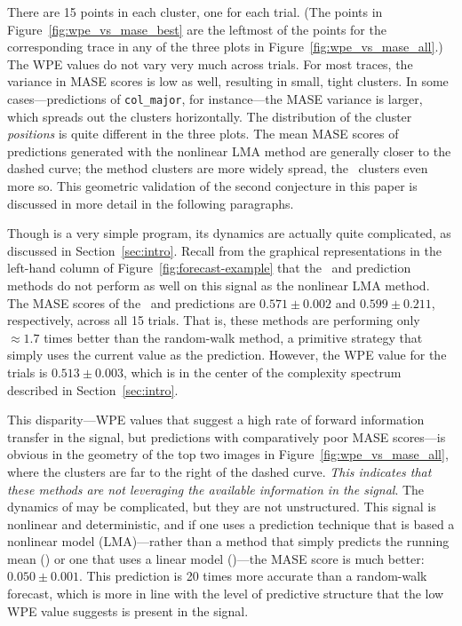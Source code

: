 There are 15 points in each cluster, one for each trial.  (The points
in Figure~\ref{fig:wpe_vs_mase_best} are the leftmost of the points
for the corresponding trace in any of the three plots in
Figure~\ref{fig:wpe_vs_mase_all}.)  The WPE values do not vary very
much across trials.  For most traces, the variance in MASE scores is
low as well, resulting in small, tight clusters.  In some
cases---\arima predictions of {\tt col\_major}, for instance---the
MASE variance is larger, which spreads out the clusters horizontally.
The distribution of the cluster \emph{positions} is quite different in
the three plots.  The mean MASE scores of predictions generated with
the nonlinear LMA method are generally closer to the dashed curve; the
\arima method clusters are more widely spread, the \naive ~clusters
even more so.  This geometric validation of the second conjecture in
this paper is discussed in more detail in the following paragraphs.

Though \col is a very simple program, its dynamics are actually quite
complicated, as discussed in Section~\ref{sec:intro}.  Recall from the
graphical representations in the left-hand column of
Figure~\ref{fig:forecast-example} that the \naive ~and \arima
prediction methods do not perform as well on this signal as the
nonlinear LMA method.  The MASE scores of the \naive ~and \arima
predictions are $0.571 \pm 0.002$ and $0.599 \pm 0.211$, respectively,
across all 15 trials.  That is, these methods are performing only
$\approx 1.7$ times better than the random-walk method, a primitive
strategy that simply uses the current value as the prediction.
However, the WPE value for the \col trials is $0.513 \pm 0.003$, which
is in the center of the complexity spectrum described in
Section~\ref{sec:intro}.

This disparity---WPE values that suggest a high rate of forward
information transfer in the signal, but predictions with comparatively
poor MASE scores---is obvious in the geometry of the top two images in
Figure~\ref{fig:wpe_vs_mase_all}, where the \col clusters are far to
the right of the dashed curve.  \emph{This indicates that these
  methods are not leveraging the available information in the signal}.
The dynamics of \col may be complicated, but they are not
unstructured.  This signal is nonlinear and
deterministic\cite{mytkowicz09}, and if one uses a prediction
technique that is based a nonlinear model (LMA)---rather than a method
that simply predicts the running mean (\naive) or one that uses a
linear model (\arima)---the MASE score is much better: $0.050 \pm
0.001$.  This prediction is 20 times more accurate than a random-walk
forecast, which is more in line with the level of predictive structure
that the low WPE value suggests is present in the signal.

